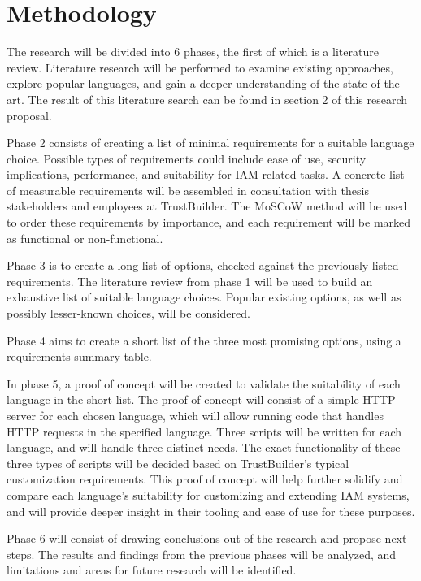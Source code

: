 \section{Methodology}%
\label{sec:methodology}

The research will be divided into 6 phases, the first of which is a literature review. Literature research will be performed to examine existing approaches, explore popular languages, and gain a deeper understanding of the state of the art. The result of this literature search can be found in section 2 of this research proposal.

Phase 2 consists of creating a list of minimal requirements for a suitable language choice. Possible types of requirements could include ease of use, security implications, performance, and suitability for IAM-related tasks. A concrete list of measurable requirements will be assembled in consultation with thesis stakeholders and employees at TrustBuilder. The MoSCoW method will be used to order these requirements by importance, and each requirement will be marked as functional or non-functional.

Phase 3 is to create a long list of options, checked against the previously listed requirements. The literature review from phase 1 will be used to build an exhaustive list of suitable language choices. Popular existing options, as well as possibly lesser-known choices, will be considered.

Phase 4 aims to create a short list of the three most promising options, using a requirements summary table.

In phase 5, a proof of concept will be created to validate the suitability of each language in the short list. The proof of concept will consist of a simple HTTP server for each chosen language, which will allow running code that handles HTTP requests in the specified language. Three scripts will be written for each language, and will handle three distinct needs. The exact functionality of these three types of scripts will be decided based on TrustBuilder's typical customization requirements. This proof of concept will help further solidify and compare each language's suitability for customizing and extending IAM systems, and will provide deeper insight in their tooling and ease of use for these purposes.

Phase 6 will consist of drawing conclusions out of the research and propose next steps. The results and findings from the previous phases will be analyzed, and limitations and areas for future research will be identified.

